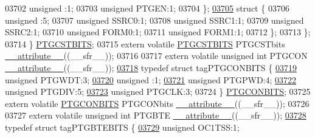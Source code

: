\begin{DoxyCode}
03702       \textcolor{keywordtype}{unsigned} :1;
03703       \textcolor{keywordtype}{unsigned} PTGEN:1;
03704     \};
\hypertarget{a00015_source_l03705}{}\hyperlink{a00015}{03705}     \textcolor{keyword}{struct }\{
03706       \textcolor{keywordtype}{unsigned} :5;
03707       \textcolor{keywordtype}{unsigned} SSRC0:1;
03708       \textcolor{keywordtype}{unsigned} SSRC1:1;
03709       \textcolor{keywordtype}{unsigned} SSRC2:1;
03710       \textcolor{keywordtype}{unsigned} FORM0:1;
03711       \textcolor{keywordtype}{unsigned} FORM1:1;
03712     \};
03713   \};
03714 \} \hyperlink{a00014_d9/d41/a00666}{PTGCSTBITS};
03715 \textcolor{keyword}{extern} \textcolor{keyword}{volatile} \hyperlink{a00014_d9/d41/a00666}{PTGCSTBITS} PTGCSTbits \hyperlink{a00015_a493c46f03454991ccc5aa7a6e1dfb2a7}{\_\_attribute\_\_}((\_\_sfr\_\_));
03716 
03717 \textcolor{keyword}{extern} \textcolor{keyword}{volatile} \textcolor{keywordtype}{unsigned} \textcolor{keywordtype}{int}  PTGCON \hyperlink{a00015_a493c46f03454991ccc5aa7a6e1dfb2a7}{\_\_attribute\_\_}((\_\_sfr\_\_));
\hypertarget{a00015_source_l03718}{}\hyperlink{a00014}{03718} \textcolor{keyword}{typedef} \textcolor{keyword}{struct }tagPTGCONBITS \{
\hypertarget{a00015_source_l03719}{}\hyperlink{a00014_a176187b8627a34a5038498db3c1a632d}{03719}   \textcolor{keywordtype}{unsigned} PTGWDT:3;
\hypertarget{a00015_source_l03720}{}\hyperlink{a00014_adf71f3d8410c1f1dbbc96680a92c49af}{03720}   \textcolor{keywordtype}{unsigned} :1;
\hypertarget{a00015_source_l03721}{}\hyperlink{a00014_a24a9b9391e229bfc62ce56a10fe2e0f9}{03721}   \textcolor{keywordtype}{unsigned} PTGPWD:4;
\hypertarget{a00015_source_l03722}{}\hyperlink{a00014_a6831a3bfc105c111623e903cd3b76339}{03722}   \textcolor{keywordtype}{unsigned} PTGDIV:5;
\hypertarget{a00015_source_l03723}{}\hyperlink{a00014_acfbbd794489cadb4287cfd2ed6ad09cc}{03723}   \textcolor{keywordtype}{unsigned} PTGCLK:3;
03724 \} \hyperlink{a00014_da/d46/a00665}{PTGCONBITS};
03725 \textcolor{keyword}{extern} \textcolor{keyword}{volatile} \hyperlink{a00014_da/d46/a00665}{PTGCONBITS} PTGCONbits \hyperlink{a00015_a493c46f03454991ccc5aa7a6e1dfb2a7}{\_\_attribute\_\_}((\_\_sfr\_\_));
03726 
03727 \textcolor{keyword}{extern} \textcolor{keyword}{volatile} \textcolor{keywordtype}{unsigned} \textcolor{keywordtype}{int}  PTGBTE \hyperlink{a00015_a493c46f03454991ccc5aa7a6e1dfb2a7}{\_\_attribute\_\_}((\_\_sfr\_\_));
\hypertarget{a00015_source_l03728}{}\hyperlink{a00014}{03728} \textcolor{keyword}{typedef} \textcolor{keyword}{struct }tagPTGBTEBITS \{
\hypertarget{a00015_source_l03729}{}\hyperlink{a00014_a91fbf6e4b30a29980a14616e5371f553}{03729}   \textcolor{keywordtype}{unsigned} OC1TSS:1;

\end{DoxyCode}
